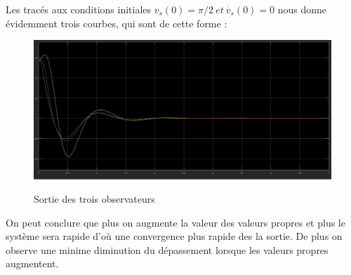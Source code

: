 \pagebreak
\par Les tracés aux conditions initiales $v_s(0)=\pi/2~et~\dot{v_s}(0)=0$ nous donne évidemment trois courbes, qui sont de cette forme :
\begin{figure}[h!]
\centering
\includegraphics[scale = 0.45]{T_3OBS.JPG}\\[0.7 cm] 
\caption{Sortie des trois observateurs}
\end{figure}
\par On peut conclure que plus on augmente la valeur des valeurs propres et plus le système sera rapide d'où une convergence plus rapide des la sortie. De plus on observe une minime diminution du dépassement lorsque les valeurs propres augmentent.

